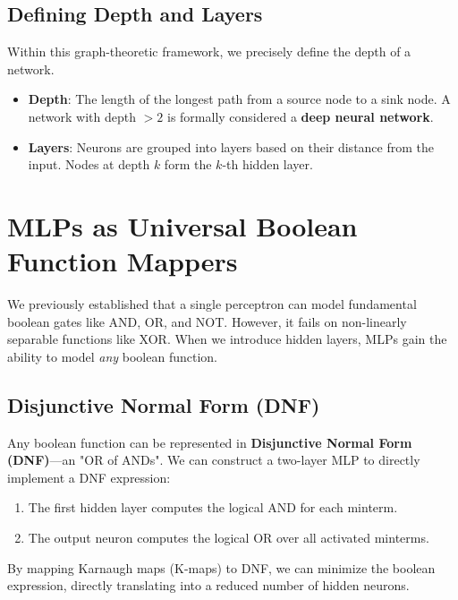 \subsection{Defining Depth and Layers}

Within this graph-theoretic framework, we precisely define the depth of a network.

\begin{itemize}
    \item \textbf{Depth}: The length of the longest path from a source node to a sink node. A network with depth $> 2$ is formally considered a \textbf{deep neural network}.
    \item \textbf{Layers}: Neurons are grouped into layers based on their distance from the input. Nodes at depth $k$ form the $k$-th hidden layer.
\end{itemize}


\section{MLPs as Universal Boolean Function Mappers}

We previously established that a single perceptron can model fundamental boolean gates like AND, OR, and NOT. However, it fails on non-linearly separable functions like XOR. When we introduce hidden layers, MLPs gain the ability to model \textit{any} boolean function.

\subsection{Disjunctive Normal Form (DNF)}

Any boolean function can be represented in \textbf{Disjunctive Normal Form (DNF)}---an "OR of ANDs". We can construct a two-layer MLP to directly implement a DNF expression:
\begin{enumerate}
    \item The first hidden layer computes the logical AND for each minterm.
    \item The output neuron computes the logical OR over all activated minterms.
\end{enumerate}

By mapping Karnaugh maps (K-maps) to DNF, we can minimize the boolean expression, directly translating into a reduced number of hidden neurons.

